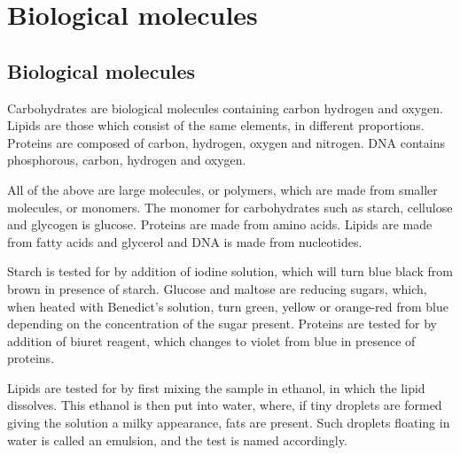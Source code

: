 \section{Biological molecules}
\subsection{Biological molecules}

Carbohydrates are biological molecules containing carbon hydrogen and oxygen. Lipids are those
which consist of the same elements, in different proportions. Proteins are composed of carbon,
hydrogen, oxygen and nitrogen. DNA contains phosphorous, carbon, hydrogen and oxygen.

All of the above are large molecules, or polymers, which are made from smaller molecules, or 
monomers. The monomer for carbohydrates such as starch, cellulose and glycogen is glucose. Proteins
are made from amino acids. Lipids are made from fatty acids and glycerol and DNA is made from
nucleotides.

Starch is tested for by addition of iodine solution, which will turn blue black from brown in 
presence of
starch. Glucose and maltose are reducing sugars, which, when heated with Benedict's solution, turn
green, yellow or orange-red from blue depending on the concentration of the sugar present. 
Proteins are tested
for by addition of biuret reagent, which changes to violet from blue in presence of proteins.

Lipids are tested for by first mixing the sample in ethanol, in which the lipid dissolves. This
ethanol is then put into water, where, if tiny droplets are formed giving the solution a milky
appearance, fats are present. Such droplets floating in water is called an emulsion, and the
test is named accordingly.


